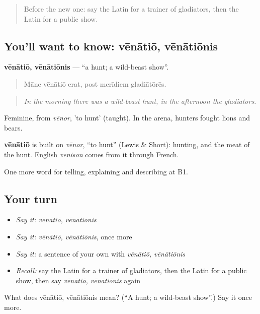 \begin{quote}
Before the new one: say the Latin for a trainer of gladiators, then the Latin for a public show.
\end{quote}

\subsection*{You'll want to know: vēnātiō, vēnātiōnis}
\textbf{vēnātiō, vēnātiōnis} — \textquotedblleft{}a hunt; a wild-beast show\textquotedblright{}.

\begin{quote}
Māne vēnātiō erat, post merīdiem gladiātōrēs.
\end{quote}

\begin{quote}
\emph{In the morning there was a wild-beast hunt, in the afternoon the gladiators.}
\end{quote}

Feminine, from \emph{vēnor}, 'to hunt' (taught). In the arena, hunters fought lions and bears.

\begin{cousinweb}
\textbf{vēnātiō} is built on \emph{vēnor}, \textquotedblleft{}to hunt\textquotedblright{} (Lewis \& Short): hunting, and the meat of the hunt. English \emph{venison} comes from it through French.
\end{cousinweb}

\begin{grammarlens}[title={What you've built}]
One more word for telling, explaining and describing at B1.
\end{grammarlens}

\subsection*{Your turn}
\begin{itemize}
\raggedright
  \item \emph{Say it:} \emph{vēnātiō, vēnātiōnis}
  \item \emph{Say it:} \emph{vēnātiō, vēnātiōnis}, once more
  \item \emph{Say it:} a sentence of your own with \emph{vēnātiō, vēnātiōnis}
  \item \emph{Recall:} say the Latin for a trainer of gladiators, then the Latin for a public show, then say \emph{vēnātiō, vēnātiōnis} again
\end{itemize}

\begin{tcolorbox}[breakable,colback=teal!4,colframe=teal!35!black,title={Before you move on}]
What does vēnātiō, vēnātiōnis mean? (\textquotedblleft{}A hunt; a wild-beast show\textquotedblright{}.) Say it once more.
\end{tcolorbox}
